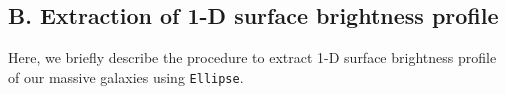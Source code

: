 \documentclass{emulateapj}
\def\rbcg{\texttt{cenHighMh}}
\def\nbcg{\texttt{cenLowMh}}
\newcommand{\update}[1]{\textcolor{Bittersweet}{#1}}
\begin{document}
\begin{CJK*}{UTF8}{gbsn}
\section{B. Extraction of 1-D surface brightness profile} 
    \label{app:A}
    
    \update{
    Here, we briefly describe the procedure to extract 1-D surface brightness profile 
    of our massive galaxies using \texttt{Ellipse}.
    }
    
    
    

\end{CJK*}
\end{document}
